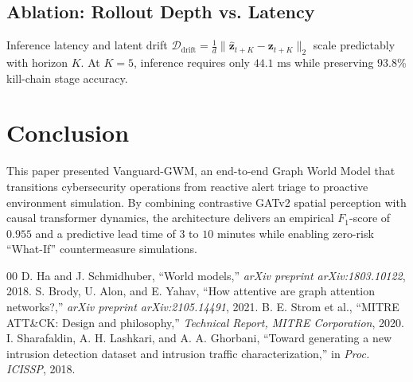 \documentclass[conference]{IEEEtran}
\begin{document}
\subsection{Ablation: Rollout Depth vs. Latency}
Inference latency and latent drift $\mathcal{D}_{\text{drift}} = \frac{1}{d}\|\hat{\mathbf{z}}_{t+K} - \mathbf{z}_{t+K}\|_2$ scale predictably with horizon $K$. At $K=5$, inference requires only $44.1\text{ ms}$ while preserving $93.8\%$ kill-chain stage accuracy.

\section{Conclusion}
This paper presented Vanguard-GWM, an end-to-end Graph World Model that transitions cybersecurity operations from reactive alert triage to proactive environment simulation. By combining contrastive GATv2 spatial perception with causal transformer dynamics, the architecture delivers an empirical $F_1$-score of $0.955$ and a predictive lead time of $3$ to $10$ minutes while enabling zero-risk ``What-If'' countermeasure simulations.

\begin{thebibliography}{00}
 D. Ha and J. Schmidhuber, ``World models,'' \textit{arXiv preprint arXiv:1803.10122}, 2018.
 S. Brody, U. Alon, and E. Yahav, ``How attentive are graph attention networks?,'' \textit{arXiv preprint arXiv:2105.14491}, 2021.
 B. E. Strom et al., ``MITRE ATT\&CK: Design and philosophy,'' \textit{Technical Report, MITRE Corporation}, 2020.
 I. Sharafaldin, A. H. Lashkari, and A. A. Ghorbani, ``Toward generating a new intrusion detection dataset and intrusion traffic characterization,'' in \textit{Proc. ICISSP}, 2018.
\end{thebibliography}
\end{document}
